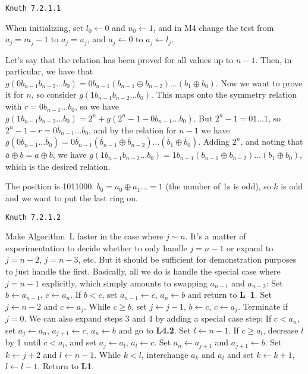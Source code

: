 \topglue 0.5in
\centerline{\tt Knuth 7.2.1.1}
\vskip 0.3in

 When initializing, set $l_0 \gets 0$
and $u_0 \gets 1$, and in M4 change the test from $a_j = m_j - 1$
to $a_j = u_j$, and $a_j \gets 0$ to $a_j \gets l_j$.

\vskip 0.08in  Let's say that the relation has been proved for
all values up to $n-1$.  Then, in particular, we have that
$g\left(0 b_{n-1} b_{n-2} \ldots b_0\right) = 0 b_{n-1} \left(b_{n-1}
\oplus b_{n-2}\right)\ldots \left(b_1 \oplus b_0 \right)$.  Now we
want to prove it for $n$, so consider $g\left(1 b_{n-1} b_{n-2} \ldots b_0\right)$.  
This maps onto the symmetry relation with $r = 0 b_{n-1}\ldots b_0$, so
we have $g\left(1 b_{n-1} b_{n-2} \ldots b_0\right) = 2^n
+ g\left(2^n - 1 - 0 b_{n-1}\ldots b_0\right)$.  But $2^n-1 = 01\ldots1$,
so $2^n - 1 - r = 0 \bar b_{n-1} \ldots \bar b_0$, and by the relation for $n-1$
we have $g \left( 0 \bar b_{n-1} \ldots \bar b_0 \right) = 0 \bar b_{n-1}
\left(\bar b_{n-1} \oplus \bar b_{n-2}\right) \ldots \left(\bar b_1 \oplus \bar b_0\right)$.
Adding $2^n$, and noting that $\bar a \oplus \bar b = a \oplus b$, we
have $g\left(1 b_{n-1} b_{n-2} \ldots b_0\right) = 1 b_{n-1} 
\left(b_{n-1} \oplus b_{n-2}\right) \ldots \left(b_1 \oplus b_0\right)$,
which is the desired relation.

\vskip 0.08in  The position is 1011000.
$b_0 = a_0 \oplus a_1 \ldots = 1$ (the number of 1s is odd),
so $k$ is odd and we want to put the last ring on.

\topglue 0.5in
\centerline{\tt Knuth 7.2.1.2}
\vskip 0.3in

 Make Algorithm~L faster in the case where $j \sim n$.\hfil\break
It's a matter of experimentation to decide whether to only handle $j = n-1$ or
expand to $j = n - 2$, $j = n - 3$, etc.  But it should be sufficient for demonstration
purposes to just handle the first.  Basically, all we do is handle the special case
where $j = n-1$ explicitly, which simply amounts to swapping $a_{n-1}$ and
$a_{n-2}$:
 Set $b \gets a_{n-1}$, $c \gets a_{n}$.  If $b < c$, set
$a_{n-1} \gets c$, $a_n \gets b$ and return to {\bf L~1}.
 Set $j \gets n - 2$ and $c \gets a_j$.  While $c \ge b$, set
$j \gets j - 1$, $b \gets c$, $c \gets a_j$.  Terminate if $j = 0$.
We can also expand steps 3 and 4 by adding a special case step:
 If $c < a_n$, set $a_j \gets a_n$, $a_{j+1} \gets c$, $a_n \gets b$
and go to {\bf L4.2}.
 Set $l \gets n - 1$.  If $c \ge a_l$, decrease $l$ by 1 until $c < a_l$,
and set $a_j \gets a_l$, $a_l \gets c$.
 Set $a_n \gets a_{j+1}$ and $a_{j+1} \gets b$.
 Set $k \gets j + 2$ and $l \gets n - 1$.  While $k < l$,
interchange $a_k$ and $a_l$ and set $k \gets k + 1$, $l \gets l - 1$.  Return to {\bf L1}.

